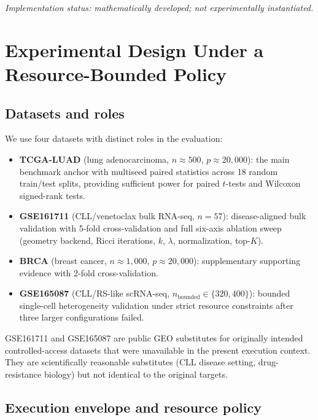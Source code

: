 \documentclass[11pt]{article}
\begin{document}
\emph{Implementation status: mathematically developed; not experimentally instantiated.}

\section{Experimental Design Under a Resource-Bounded Policy}
\label{sec:experimental}

\subsection{Datasets and roles}

We use four datasets with distinct roles in the evaluation:
\begin{itemize}[leftmargin=1.5em]
\item \textbf{TCGA-LUAD} (lung adenocarcinoma, $n \approx 500$, $p \approx 20{,}000$): the main benchmark anchor with multiseed paired statistics across 18 random train/test splits, providing sufficient power for paired $t$-tests and Wilcoxon signed-rank tests.
\item \textbf{GSE161711} (CLL/venetoclax bulk RNA-seq, $n = 57$): disease-aligned bulk validation with 5-fold cross-validation and full six-axis ablation sweep (geometry backend, Ricci iterations, $k$, $\lambda$, normalization, top-$K$).
\item \textbf{BRCA} (breast cancer, $n \approx 1{,}000$, $p \approx 20{,}000$): supplementary supporting evidence with 2-fold cross-validation.
\item \textbf{GSE165087} (CLL/RS-like scRNA-seq, $n_{\text{bounded}} \in \{320, 400\}$): bounded single-cell heterogeneity validation under strict resource constraints after three larger configurations failed.
\end{itemize}

GSE161711 and GSE165087 are public GEO substitutes for originally intended controlled-access datasets that were unavailable in the present execution context.
They are scientifically reasonable substitutes (CLL disease setting, drug-resistance biology) but not identical to the original targets.

\subsection{Execution envelope and resource policy}
\end{document}
